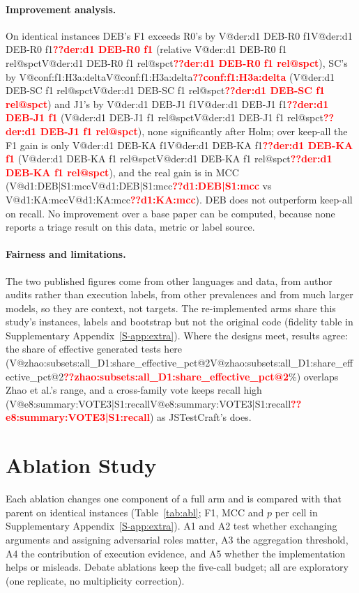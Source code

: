 \documentclass[journal]{IEEEtran}
\makeatletter
\newcommand{\V}[1]{\ifcsname V@#1\endcsname\csname V@#1\endcsname\else\textbf{\textcolor{red}{??#1}}\fi}
\newcommand{\Sref}[1]{\ref{S-#1}}
\makeatother
\begin{document}
\paragraph{Improvement analysis.} On identical instances DEB's F1 exceeds R0's by \V{der:d1 DEB-R0 f1} (relative \V{der:d1 DEB-R0 f1 rel@spct}), SC's by \V{conf:f1:H3a:delta} (\V{der:d1 DEB-SC f1 rel@spct}) and J1's by \V{der:d1 DEB-J1 f1} (\V{der:d1 DEB-J1 f1 rel@spct}), none significantly after Holm; over keep-all the F1 gain is only \V{der:d1 DEB-KA f1} (\V{der:d1 DEB-KA f1 rel@spct}), and the real gain is in MCC (\V{d1:DEB|S1:mcc} vs \V{d1:KA:mcc}). DEB does not outperform keep-all on recall. No improvement over a base paper can be computed, because none reports a triage result on this data, metric or label source.

\paragraph{Fairness and limitations.} The two published figures come from other languages and data, from author audits rather than execution labels, from other prevalences and from much larger models, so they are context, not targets. The re-implemented arms share this study's instances, labels and bootstrap but not the original code (fidelity table in Supplementary Appendix~\Sref{app:extra}). Where the designs meet, results agree: the share of effective generated tests here (\V{zhao:subsets:all_D1:share_effective_pct@2}\%) overlaps Zhao et al.'s range, and a cross-family vote keeps recall high (\V{e8:summary:VOTE3|S1:recall}) as JSTestCraft's does.

\section{Ablation Study}\label{sec:ablation}
Each ablation changes one component of a full arm and is compared with that parent on identical instances (Table~\ref{tab:abl}; F1, MCC and $p$ per cell in Supplementary Appendix~\Sref{app:extra}). A1 and A2 test whether exchanging arguments and assigning adversarial roles matter, A3 the aggregation threshold, A4 the contribution of execution evidence, and A5 whether the implementation helps or misleads. Debate ablations keep the five-call budget; all are exploratory (one replicate, no multiplicity correction).
\end{document}
